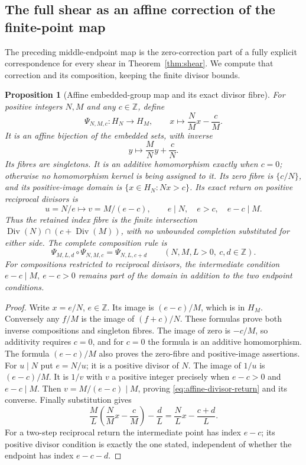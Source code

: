 \documentclass[11pt]{article}
\newtheorem{proposition}[theorem]{Proposition}
\theoremstyle{definition}\newtheorem{definition}[theorem]{Definition}
\theoremstyle{remark}\newtheorem{remark}[theorem]{Remark}
\DeclareMathOperator{\Div}{Div}
\newcommand{\Z}{\mathbb Z}\newcommand{\Q}{\mathbb Q}
\begin{document}


\subsection{The full shear as an affine correction of the finite-point map}

The preceding middle-endpoint map is the zero-correction part
of a fully explicit correspondence for every shear in
Theorem~\ref{thm:shear}.  We compute that correction and its
composition, keeping the finite divisor bounds.

\begin{proposition}[Affine embedded-group map and its exact divisor fibre]
\label{prop:affine-point}
For positive integers \(N,M\) and any \(c\in\Z\), define
\[
 \Psi_{N,M,c}:H_N\longrightarrow H_M,\qquad
 x\longmapsto\frac NM x-\frac cM .
\]
It is an affine bijection of the embedded sets, with inverse
\[
 y\longmapsto\frac MN y+\frac cN.
\]
Its fibres are singletons.  It is an additive homomorphism
exactly when \(c=0\); otherwise no homomorphism kernel
is being assigned to it.  Its zero fibre is \(\{c/N\}\),
and its positive-image domain is
\(\{x\in H_N:Nx>c\}\).  Its exact return on positive
reciprocal divisors is
\begin{equation}\label{eq:affine-divisor-return}
 u=N/e\longmapsto v=M/(e-c),\qquad
 e\mid N,\quad e>c,\quad e-c\mid M.
\end{equation}
Thus the retained index fibre is the finite intersection
\(\Div(N)\cap(c+\Div(M))\), with no unbounded
completion substituted for either side.  The complete
composition rule is
\[
 \Psi_{M,L,d}\circ\Psi_{N,M,c}=\Psi_{N,L,c+d}
 \qquad(N,M,L>0,\ c,d\in\Z).
\]
For compositions restricted to reciprocal divisors,
the intermediate condition \(e-c\mid M,\ e-c>0\)
remains part of the domain in addition to the two
endpoint conditions.
\end{proposition}
\begin{proof}
Write \(x=e/N\), \(e\in\Z\).  Its image is
\((e-c)/M\), which is in \(H_M\).  Conversely any
\(f/M\) is the image of \((f+c)/N\).  These formulas
prove both inverse compositions and singleton fibres.
The image of zero is \(-c/M\), so additivity
requires \(c=0\), and for \(c=0\) the formula is
an additive homomorphism.  The formula \((e-c)/M\)
also proves the zero-fibre and positive-image assertions.
For \(u\mid N\) put \(e=N/u\); it is a positive
divisor of \(N\).  The image of \(1/u\) is
\((e-c)/M\).  It is \(1/v\) with \(v\) a positive
integer precisely when \(e-c>0\) and \(e-c\mid M\).
Then \(v=M/(e-c)\mid M\), proving
\eqref{eq:affine-divisor-return} and its converse.
Finally substitution gives
\[
 \frac ML\left(\frac NM x-\frac cM\right)-\frac dL
       =\frac NLx-\frac{c+d}{L}.
\]
For a two-step reciprocal return the intermediate
point has index \(e-c\); its positive divisor
condition is exactly the one stated, independent
of whether the endpoint has index \(e-c-d\).
\end{proof}
\end{document}
